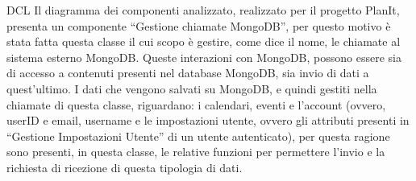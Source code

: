 \begin{listaPersonale}{DCL}
    Il diagramma dei componenti analizzato, realizzato per il progetto PlanIt, presenta un componente “Gestione chiamate MongoDB”, per questo motivo è stata fatta questa classe il cui scopo è gestire, come dice il nome, le chiamate al sistema esterno MongoDB. Queste interazioni con MongoDB, possono essere sia di accesso a contenuti presenti nel database MongoDB, sia invio di dati a quest'ultimo. I dati che vengono salvati su MongoDB, e quindi gestiti nella chiamate di questa classe, riguardano: i calendari, eventi e l'account (ovvero, userID e email, username e le impostazioni utente, ovvero gli attributi presenti in “Gestione Impostazioni Utente” di un utente autenticato), per questa ragione sono presenti, in questa classe, le relative funzioni per permettere l'invio e la richiesta di ricezione di questa tipologia di dati.
    \begin{comment}
        \begin{center}
            \\
            \blfootnote{Immagine \href{https://github.com/Life-planner/Documentazione/blob/main/D3/img/Diagrammi/png/path/to/img.png}{PNG}/\href{https://github.com/Life-planner/Documentazione/blob/main/D3/img/Diagrammi/svg/path/to/img.svg}{SVG} nome file}
        \end{center}
    \end{comment}


\end{listaPersonale}
